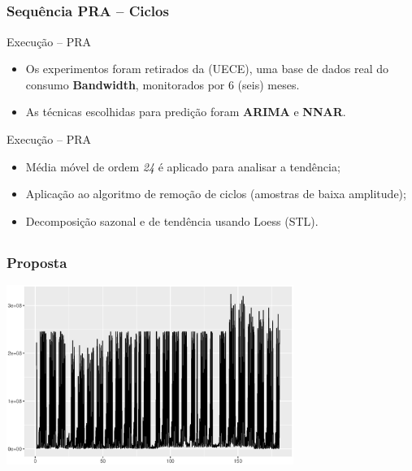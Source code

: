 \documentclass[aspectratio=169]{beamer}
\begin{document}
\subsection{}
\begin{frame}
\frametitle{Sequência PRA -- Ciclos}
\begin{block}{Execução -- PRA}
    \begin{itemize}
        \item Os experimentos foram retirados da (UECE), uma base de dados real do consumo \textbf{Bandwidth}, monitorados por 6 (seis) meses.
        \item As técnicas escolhidas para predição foram \textbf{ARIMA} e \textbf{NNAR}.
        \end{itemize}
\end{block}
 \begin{block}{Execução -- PRA}
        \begin{itemize}[triangle]
            \item Média móvel de ordem \emph{24} é aplicado para analisar a tendência;
            \item Aplicação ao algoritmo de remoção de ciclos (amostras de baixa amplitude);
            \item Decomposição sazonal e de tendência usando Loess (STL).
        \end{itemize}
        \end{block}
\end{frame}

\subsection{}
\begin{frame}
\frametitle{Proposta}

        \centering
\includegraphics[width=0.7\textwidth,angle=0]{myts_avg_eps.eps}
\end{frame}
\end{document}
